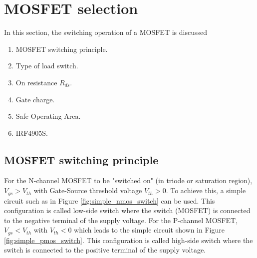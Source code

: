 \documentclass[../main.tex]{subfiles}
\begin{document}
    \section{MOSFET selection}
    \justify
    In this section, the switching operation of a MOSFET is discussed
    \begin{enumerate}
        \item MOSFET switching principle.
        \item Type of load switch.
        \item On resistance $R_{ds}$.
        \item Gate charge.
        \item Safe Operating Area.
        \item IRF4905S.
    \end{enumerate}

    \pagebreak
    \subsection{MOSFET switching principle}

    \justify
    For the N-channel MOSFET to be  "switched on" (in triode or saturation region), $V_{gs} > V_{th}$ with Gate-Source threshold voltage $V_{th} > 0$. To achieve this, a simple circuit such as in Figure \ref{fig:simple_nmos_switch} can be used. This configuration is called low-side switch where  the switch (MOSFET) is connected to the negative terminal of the supply voltage. For the P-channel MOSFET, $V_{gs} < V_{th}$ with $V_{th} < 0$ which leads to the simple circuit shown in Figure \ref{fig:simple_pmos_switch}. This configuration is called high-side switch where  the switch is connected to the positive terminal of the supply voltage.
\end{document}
